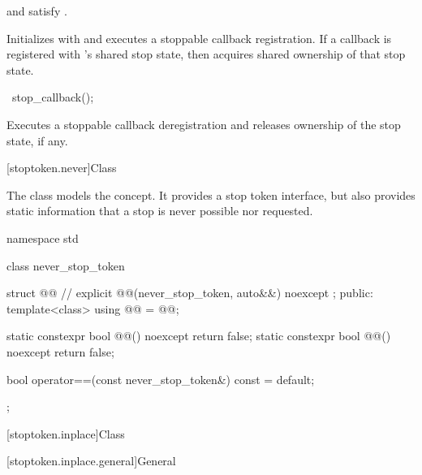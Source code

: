 \begin{itemdescr}
\pnum
\constraints
{} and  satisfy
.

\pnum
\effects
Initializes  with 
and executes a stoppable callback registration.
If a callback is registered with 's shared stop state,
then  acquires shared ownership of that stop state.
\end{itemdescr}

%
\begin{itemdecl}
~stop_callback();
\end{itemdecl}

\begin{itemdescr}
\pnum
\effects
Executes a stoppable callback deregistration and
releases ownership of the stop state, if any.
\end{itemdescr}

[stoptoken.never]{Class }

\pnum
The class  models
the  concept.
It provides a stop token interface,
but also provides static information
that a stop is never possible nor requested.
%
\begin{codeblock}
namespace std {
  class never_stop_token {
    struct @@ {                                      // \expos
      explicit @@(never_stop_token, auto&&) noexcept {}
    };
  public:
    template<class>
      using @@ = @@;

    static constexpr bool @@() noexcept { return false; }
    static constexpr bool @@() noexcept { return false; }

    bool operator==(const never_stop_token&) const = default;
  };
}
\end{codeblock}

[stoptoken.inplace]{Class }

[stoptoken.inplace.general]{General}

